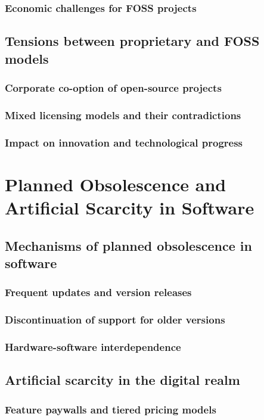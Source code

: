 \subsubsection{Economic challenges for FOSS projects}
\subsection{Tensions between proprietary and FOSS models}
\subsubsection{Corporate co-option of open-source projects}
\subsubsection{Mixed licensing models and their contradictions}
\subsubsection{Impact on innovation and technological progress}

\newpage
\section{Planned Obsolescence and Artificial Scarcity in Software}
\subsection{Mechanisms of planned obsolescence in software}
\subsubsection{Frequent updates and version releases}
\subsubsection{Discontinuation of support for older versions}
\subsubsection{Hardware-software interdependence}
\subsection{Artificial scarcity in the digital realm}
\subsubsection{Feature paywalls and tiered pricing models}
